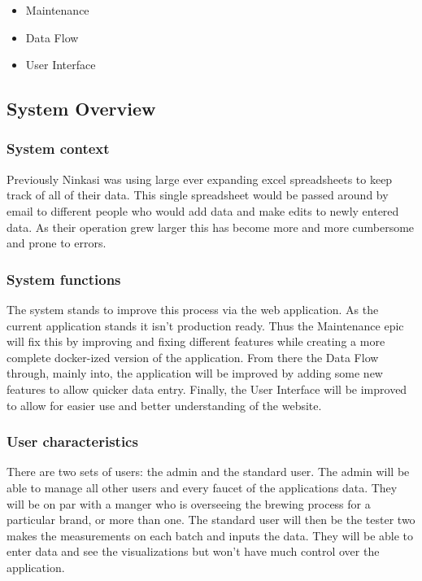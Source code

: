     \begin{itemize}
        \item Maintenance 
        \item Data Flow
        \item User Interface
    \end{itemize}
    
    \subsection{System Overview}
    
        \subsubsection{System context}
        Previously Ninkasi was using large ever expanding excel spreadsheets to keep track of all of their data.  This single spreadsheet would be passed around by email to different people who would add data and make edits to newly entered data.  As their operation grew larger this has become more and more cumbersome and prone to errors.
    
        \subsubsection{System functions}
        The system stands to improve this process via the web application.  As the current application stands it isn't production ready.  Thus the Maintenance epic will fix this by improving and fixing different features while creating a more complete docker-ized version of the application.  From there the Data Flow through, mainly into, the application will be improved by adding some new features to allow quicker data entry.  Finally, the User Interface will be improved to allow for easier use and better understanding of the website.
        
        \subsubsection{User characteristics}
        There are two sets of users: the admin and the standard user.  The admin will be able to manage all other users and every faucet of the applications data.  They will be on par with a manger who is overseeing the brewing process for a particular brand, or more than one.  The standard user will then be the tester two makes the measurements on each batch and inputs the data.  They will be able to enter data and see the visualizations but won't have much control over the application.
        
